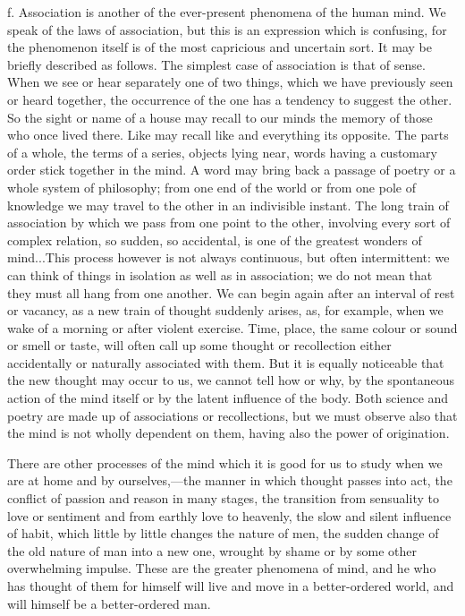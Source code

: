 \documentclass[11pt,letter]{article}
\begin{document}
\par  f. Association is another of the ever-present phenomena of the human mind. We speak of the laws of association, but this is an expression which is confusing, for the phenomenon itself is of the most capricious and uncertain sort. It may be briefly described as follows. The simplest case of association is that of sense. When we see or hear separately one of two things, which we have previously seen or heard together, the occurrence of the one has a tendency to suggest the other. So the sight or name of a house may recall to our minds the memory of those who once lived there. Like may recall like and everything its opposite. The parts of a whole, the terms of a series, objects lying near, words having a customary order stick together in the mind. A word may bring back a passage of poetry or a whole system of philosophy; from one end of the world or from one pole of knowledge we may travel to the other in an indivisible instant. The long train of association by which we pass from one point to the other, involving every sort of complex relation, so sudden, so accidental, is one of the greatest wonders of mind...This process however is not always continuous, but often intermittent: we can think of things in isolation as well as in association; we do not mean that they must all hang from one another. We can begin again after an interval of rest or vacancy, as a new train of thought suddenly arises, as, for example, when we wake of a morning or after violent exercise. Time, place, the same colour or sound or smell or taste, will often call up some thought or recollection either accidentally or naturally associated with them. But it is equally noticeable that the new thought may occur to us, we cannot tell how or why, by the spontaneous action of the mind itself or by the latent influence of the body. Both science and poetry are made up of associations or recollections, but we must observe also that the mind is not wholly dependent on them, having also the power of origination.

\par  There are other processes of the mind which it is good for us to study when we are at home and by ourselves,—the manner in which thought passes into act, the conflict of passion and reason in many stages, the transition from sensuality to love or sentiment and from earthly love to heavenly, the slow and silent influence of habit, which little by little changes the nature of men, the sudden change of the old nature of man into a new one, wrought by shame or by some other overwhelming impulse. These are the greater phenomena of mind, and he who has thought of them for himself will live and move in a better-ordered world, and will himself be a better-ordered man.
\end{document}

